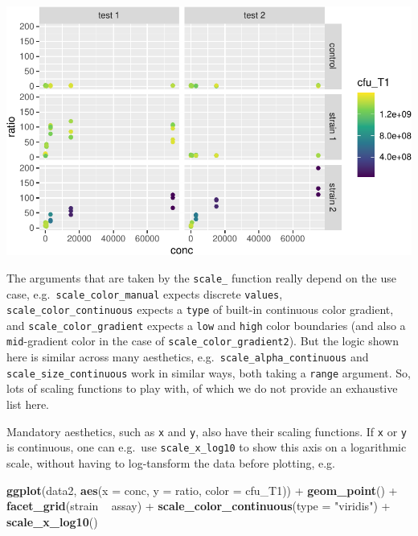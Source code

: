 \documentclass[]{book}
\newenvironment{Shaded}{}{}
\newcommand{\DataTypeTok}[1]{\textcolor[rgb]{0.56,0.13,0.00}{#1}}
\newcommand{\KeywordTok}[1]{\textcolor[rgb]{0.00,0.44,0.13}{\textbf{#1}}}
\newcommand{\NormalTok}[1]{#1}
\newcommand{\OperatorTok}[1]{\textcolor[rgb]{0.40,0.40,0.40}{#1}}
\newcommand{\StringTok}[1]{\textcolor[rgb]{0.25,0.44,0.63}{#1}}
\begin{document}
\begin{center}\includegraphics[width=\textwidth]{TRES-Tidy-Tutorial_files/figure-latex/unnamed-chunk-141-1} \end{center}

The arguments that are taken by the \texttt{scale\_} function really depend on the use case, e.g.~\texttt{scale\_color\_manual} expects discrete \texttt{values}, \texttt{scale\_color\_continuous} expects a \texttt{type} of built-in continuous color gradient, and \texttt{scale\_color\_gradient} expects a \texttt{low} and \texttt{high} color boundaries (and also a \texttt{mid}-gradient color in the case of \texttt{scale\_color\_gradient2}). But the logic shown here is similar across many aesthetics, e.g.~\texttt{scale\_alpha\_continuous} and \texttt{scale\_size\_continuous} work in similar ways, both taking a \texttt{range} argument. So, lots of scaling functions to play with, of which we do not provide an exhaustive list here.

Mandatory aesthetics, such as \texttt{x} and \texttt{y}, also have their scaling functions. If \texttt{x} or \texttt{y} is continuous, one can e.g.~use \texttt{scale\_x\_log10} to show this axis on a logarithmic scale, without having to log-tansform the data before plotting, e.g.

\begin{Shaded}
\begin{Highlighting}[]
\KeywordTok{ggplot}\NormalTok{(data2, }\KeywordTok{aes}\NormalTok{(}\DataTypeTok{x =}\NormalTok{ conc, }\DataTypeTok{y =}\NormalTok{ ratio, }\DataTypeTok{color =}\NormalTok{ cfu_T1)) }\OperatorTok{+}
\StringTok{  }\KeywordTok{geom_point}\NormalTok{() }\OperatorTok{+}
\StringTok{  }\KeywordTok{facet_grid}\NormalTok{(strain }\OperatorTok{~}\StringTok{ }\NormalTok{assay) }\OperatorTok{+}
\StringTok{  }\KeywordTok{scale_color_continuous}\NormalTok{(}\DataTypeTok{type =} \StringTok{"viridis"}\NormalTok{) }\OperatorTok{+}
\StringTok{  }\KeywordTok{scale_x_log10}\NormalTok{()}
\end{Highlighting}
\end{Shaded}
\end{document}
